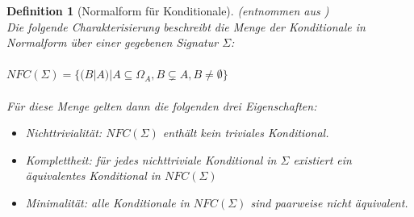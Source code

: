 \documentclass[12pt,a4paper]{article}
\newtheorem{theorem}{Definition}
\begin{document}
\begin{theorem}[Normalform für Konditionale](entnommen aus \cite{beierle19})\\
Die folgende Charakterisierung beschreibt die Menge der Konditionale in Normalform über einer gegebenen Signatur $\Sigma$: \\ \\
$NFC(\Sigma) = \{(B|A)|A \subseteq \Omega_A, B \subsetneq A, B \neq \emptyset \}$ \\ \\
Für diese Menge gelten dann die folgenden drei Eigenschaften:\
 \begin{itemize}
\item{Nichttrivialität: $NFC(\Sigma)$ enthält kein triviales Konditional.}
\item{Komplettheit: für jedes nichttriviale Konditional in $\Sigma$ existiert ein äquivalentes Konditional in $NFC(\Sigma)$ }
\item{Minimalität: alle Konditionale in $NFC(\Sigma)$ sind paarweise nicht äquivalent.}
\end{itemize}
\end{theorem}
\end{document}
